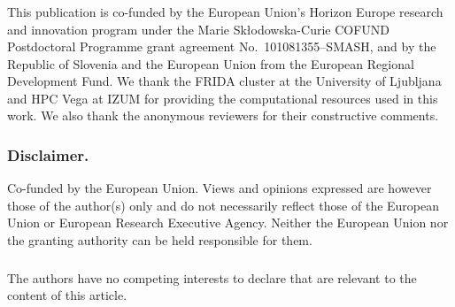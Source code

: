 \documentclass[runningheads]{llncs}
\begin{document}
\begin{credits}
\subsubsection{\ackname} This publication is co-funded by the European Union's Horizon Europe research and innovation program under the Marie Sk\l{}odowska-Curie COFUND Postdoctoral Programme grant agreement No.~101081355--SMASH, and by the Republic of Slovenia and the European Union from the European Regional Development Fund. We thank the FRIDA cluster at the University of Ljubljana and HPC Vega at IZUM for providing the computational resources used in this work. We also thank the anonymous reviewers for their constructive comments.

\subsubsection{Disclaimer.} Co-funded by the European Union. Views and opinions expressed are however those of the author(s) only and do not necessarily reflect those of the European Union or European Research Executive Agency. Neither the European Union nor the granting authority can be held responsible for them.

\subsubsection{\discintname} The authors have no competing interests to declare that are relevant to the content of this article.
\end{credits}



\end{document}
